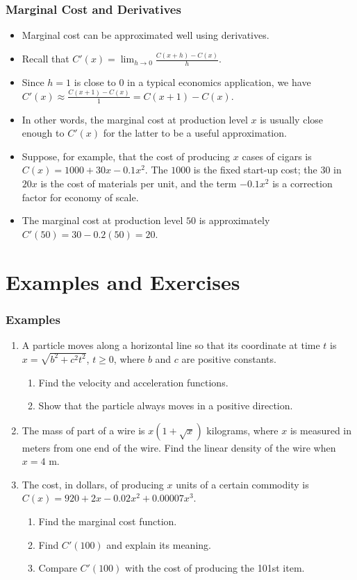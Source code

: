 \documentclass[serif,ignorenonframetext]{beamer}
\newcommand{\ds}{\displaystyle}
\begin{document}
\begin{frame}
  \frametitle{Marginal Cost and Derivatives}
  \begin{itemize}[<+->]
  \item Marginal cost can be approximated well using derivatives.
  \item Recall that $\ds C'(x) = \lim_{h\to 0} \frac{C(x+h)-C(x)}{h}$.
  \item Since $h=1$ is close to $0$ in a typical economics 
    application, we have
    $\ds C'(x) \approx \frac{C(x+1)-C(x)}{1} = C(x+1)-C(x)$.
  \item In other words, the marginal cost at production level $x$ 
    is usually close enough to $C'(x)$ for the latter to be a useful
    approximation.
  \item Suppose, for example, that the cost of producing $x$ cases 
    of cigars is $C(x)=1000+30x-0.1x^2$.  The $1000$ is the fixed
    start-up cost; the 30 in $20x$ is the cost of materials per unit,
    and the term $-0.1x^2$ is a correction factor for economy of scale.
  \item The marginal cost at production level $50$ is approximately
    $C'(50)=30-0.2(50)=20$.
  \end{itemize}
\end{frame}


\section{Examples and Exercises}

\begin{frame}
  \frametitle{Examples}
  \begin{enumerate}
  \item A particle moves along a horizontal line so that its coordinate
    at time $t$ is $x=\sqrt{b^2+c^2t^2}$, $t \ge 0$, where $b$ and $c$
    are positive constants.
    \begin{enumerate}
    \item Find the velocity and acceleration functions.
    \item Show that the particle always moves in a positive direction.
    \end{enumerate}
  \item The mass of part of a wire is $x(1+\sqrt{x})$ kilograms, where
    $x$ is measured in meters from one end of the wire.  Find the linear
    density of the wire when $x=4$ m.
  \item The cost, in dollars, of producing $x$ units of a certain commodity
    is $\ds C(x)=920+2x-0.02x^2 + 0.00007x^3$.
    \begin{enumerate}
    \item Find the marginal cost function.
    \item Find $C'(100)$ and explain its meaning.
    \item Compare $C'(100)$ with the cost of producing the 101st item.
    \end{enumerate}
  \end{enumerate}
\end{frame}
\end{document}
